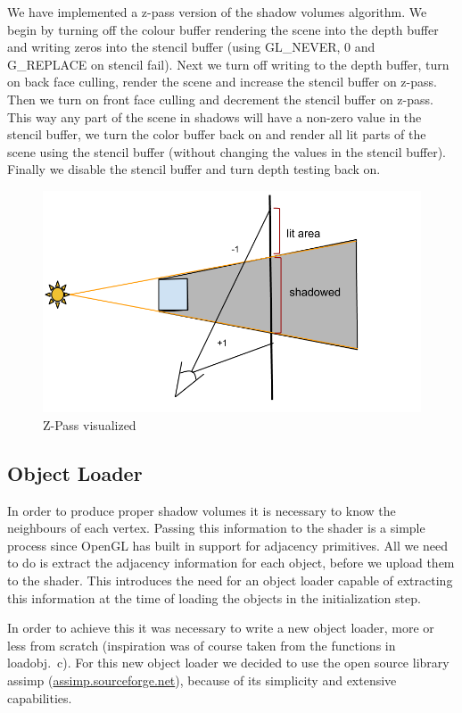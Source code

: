 \documentclass[a4paper, 12pt]{article}
\begin{document}
We have implemented a z-pass version of the shadow volumes algorithm. We begin
by turning off the colour buffer rendering the scene into the depth buffer and
writing zeros into the stencil buffer (using GL\_NEVER, 0 and G\_REPLACE on
stencil fail). Next we turn off writing to the depth buffer, turn on back face
culling, render the scene and increase the stencil buffer on z-pass. Then we
turn on front face culling and decrement the stencil buffer on z-pass. This way
any part of the scene in shadows will have a non-zero value in the stencil
buffer, we turn the color buffer back on and render all lit parts of the scene
using the stencil buffer (without changing the values in the stencil buffer).
Finally we disable the stencil buffer and turn depth testing back on.
\begin{figure}[h]
\centering
\includegraphics[width=\textwidth]{volume.png}
\caption{Z-Pass visualized }
\label{fig:zpass}
\end{figure}

\subsection{Object Loader}
In order to produce proper shadow volumes it is necessary to know the neighbours
of each vertex. Passing this information to the shader is a simple process since
OpenGL has built in support for adjacency primitives. All we need to do is
extract the adjacency information for each object, before we upload them to the
shader. This introduces the need for an object loader capable of extracting this
information at the time of loading the objects in the initialization step.

In order to achieve this it was necessary to write a new object loader, more or
less from scratch (inspiration was of course taken from the functions in
loadobj.~c). For this new object loader we decided to use the open source library
assimp (\url{assimp.sourceforge.net}), because of its simplicity and extensive
capabilities.
\end{document}
